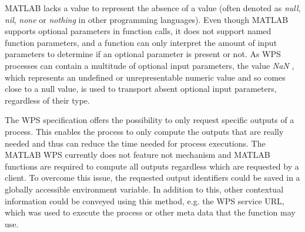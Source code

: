     MATLAB lacks a value to represent the absence of a value (often denoted as \emph{null}, \emph{nil}, \emph{none} or \emph{nothing} in other programming languages). Even though MATLAB supports optional parameters in function calls, it does not support named function parameters, and a function can only interpret the amount of input parameters to determine if an optional parameter is present or not. As WPS processes can contain a multitude of optional input parameters, the value \emph{NaN} \citep{ieee:754:2008}, which represents an undefined or unrepresentable numeric value and so comes close to a null value, is used to transport absent optional input parameters, regardless of their type.

    The WPS specification offers the possibility to only request specific outputs of a process. This enables the process to only compute the outputs that are really needed and thus can reduce the time needed for process executions. The MATLAB WPS currently does not feature not mechanism and MATLAB functions are required to compute all outputs regardless which are requested by a client.
    To overcome this issue, the requested output identifiers could be saved in a globally accessible environment variable. In addition to this, other contextual information could be conveyed using this method, e.g. the WPS service URL, which was used to execute the process or other meta data that the function may use.

